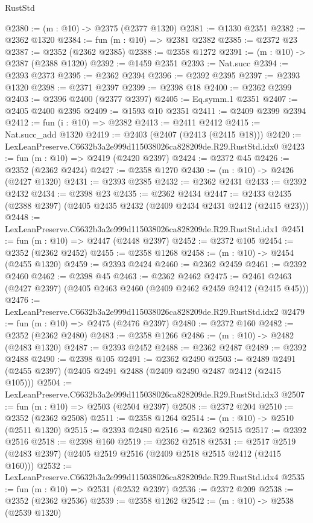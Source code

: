 \begin{lexlean}{RustStd}
\begin{coremodule}
@2380 := (m : @10) -> @2375 (@2377 @1320)
@2381 := @1330 @2351
@2382 := @2362 @1320
@2384 := fun (m : @10) => @2381 @2382
@2385 := @2372 @23
@2387 := @2352 (@2362 @2385)
@2388 := @2358 @1272
@2391 := (m : @10) -> @2387 (@2388 @1320)
@2392 := @1459 @2351
@2393 := Nat.succ
@2394 := @2393 @2373
@2395 := @2362 @2394
@2396 := @2392 @2395
@2397 := @2393 @1320
@2398 := @2371 @2397
@2399 := @2398 @18
@2400 := @2362 @2399
@2403 := @2396 @2400 (@2377 @2397)
@2405 := Eq.symm.{1} @2351
@2407 := @2405 @2400 @2395
@2409 := @1593 @10 @2351
@2411 := @2409 @2399 @2394
@2412 := fun (i : @10) => @2382
@2413 := @2411 @2412
@2415 := Nat.succ_add @1320
@2419 := @2403 (@2407 (@2413 (@2415 @18)))
@2420 := LexLeanPreserve.C6632b3a2e999d115038026ca828209de.R29.RustStd.idx0
@2423 := fun (m : @10) => @2419 (@2420 @2397)
@2424 := @2372 @45
@2426 := @2352 (@2362 @2424)
@2427 := @2358 @1270
@2430 := (m : @10) -> @2426 (@2427 @1320)
@2431 := @2393 @2385
@2432 := @2362 @2431
@2433 := @2392 @2432
@2434 := @2398 @23
@2435 := @2362 @2434
@2447 := @2433 @2435 (@2388 @2397) (@2405 @2435 @2432 (@2409 @2434 @2431 @2412 (@2415 @23)))
@2448 := LexLeanPreserve.C6632b3a2e999d115038026ca828209de.R29.RustStd.idx1
@2451 := fun (m : @10) => @2447 (@2448 @2397)
@2452 := @2372 @105
@2454 := @2352 (@2362 @2452)
@2455 := @2358 @1268
@2458 := (m : @10) -> @2454 (@2455 @1320)
@2459 := @2393 @2424
@2460 := @2362 @2459
@2461 := @2392 @2460
@2462 := @2398 @45
@2463 := @2362 @2462
@2475 := @2461 @2463 (@2427 @2397) (@2405 @2463 @2460 (@2409 @2462 @2459 @2412 (@2415 @45)))
@2476 := LexLeanPreserve.C6632b3a2e999d115038026ca828209de.R29.RustStd.idx2
@2479 := fun (m : @10) => @2475 (@2476 @2397)
@2480 := @2372 @160
@2482 := @2352 (@2362 @2480)
@2483 := @2358 @1266
@2486 := (m : @10) -> @2482 (@2483 @1320)
@2487 := @2393 @2452
@2488 := @2362 @2487
@2489 := @2392 @2488
@2490 := @2398 @105
@2491 := @2362 @2490
@2503 := @2489 @2491 (@2455 @2397) (@2405 @2491 @2488 (@2409 @2490 @2487 @2412 (@2415 @105)))
@2504 := LexLeanPreserve.C6632b3a2e999d115038026ca828209de.R29.RustStd.idx3
@2507 := fun (m : @10) => @2503 (@2504 @2397)
@2508 := @2372 @204
@2510 := @2352 (@2362 @2508)
@2511 := @2358 @1264
@2514 := (m : @10) -> @2510 (@2511 @1320)
@2515 := @2393 @2480
@2516 := @2362 @2515
@2517 := @2392 @2516
@2518 := @2398 @160
@2519 := @2362 @2518
@2531 := @2517 @2519 (@2483 @2397) (@2405 @2519 @2516 (@2409 @2518 @2515 @2412 (@2415 @160)))
@2532 := LexLeanPreserve.C6632b3a2e999d115038026ca828209de.R29.RustStd.idx4
@2535 := fun (m : @10) => @2531 (@2532 @2397)
@2536 := @2372 @209
@2538 := @2352 (@2362 @2536)
@2539 := @2358 @1262
@2542 := (m : @10) -> @2538 (@2539 @1320)

\end{coremodule}
\end{lexlean}
